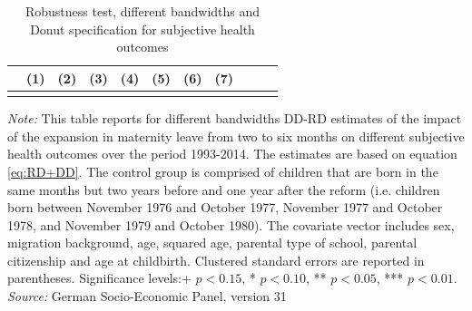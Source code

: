 \documentclass[a4paper ]{article}
\begin{document}
\begin{landscape}
\begin{table}[p] \centering
\def\sym#1{\ifmmode^{#1}\else\(^{#1}\)\fi}
\caption{Robustness test, different bandwidths and Donut specification for subjective health outcomes}\label{tab:SHBW}

\begin{tabular}{l*{10}{c}}
\toprule
 &\multicolumn{1}{c}{(1)}&\multicolumn{1}{c}{(2)}&\multicolumn{1}{c}{(3)}&\multicolumn{1}{c}{(4)}&\multicolumn{1}{c}{(5)} &\multicolumn{1}{c}{(6)}&\multicolumn{1}{c}{(7)}\\

\midrule\\
	 
 \bottomrule
\end{tabular}
\begin{minipage}{1.6\textwidth} %
{\footnotesize \textit{Note:} This table reports for different bandwidths DD-RD estimates of the impact of the expansion in maternity leave from two to six months on different subjective health outcomes over the period 1993-2014. The estimates are based on equation \ref{eq:RD+DD}. The control group is comprised of children that are born in the same months but two years before and one year after the reform (i.e. children born between November 1976 and October 1977, November 1977 and October 1978, and November 1979 and October 1980). The covariate vector includes sex, migration background, age, squared age, parental type of school, parental citizenship and age at childbirth.\newline
Clustered standard errors are reported in parentheses. Significance levels:+ \(p<0.15\), * \(p<0.10\), ** \(p<0.05\), *** \(p<0.01\). \newline \textit{Source: }German Socio-Economic Panel, version 31\par}
\end{minipage}
\end{table}

\end{landscape}
\end{document}
